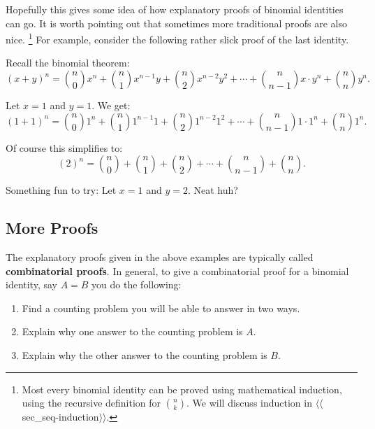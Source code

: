 \documentclass[10pt,]{book}
\newcommand{\terminology}[1]{\textbf{#1}}
\theoremstyle{plain}
\theoremstyle{definition}
\theoremstyle{definition}
\theoremstyle{definition}
\numberwithin{equation}{section}
\begin{document}
      Hopefully this gives some idea of how explanatory proofs of binomial identities can go. It is worth pointing out that sometimes more traditional proofs are also nice.
      \footnote{Most every binomial identity can be proved using mathematical induction, using the recursive definition for \({n \choose k}\). We will discuss induction in
        {$\langle\langle$sec_seq-induction$\rangle\rangle$}.\label{fn-3}} For example, consider the following rather slick proof of the last identity.
\par

      Recall the binomial theorem:
      \begin{equation*}
        (x + y)^n = {n \choose 0}x^n + {n \choose 1}x^{n-1}y + {n \choose 2}x^{n-2}y^2 + \cdots + {n \choose n-1}x\cdot y^n + {n \choose n}y^n.
      \end{equation*}
\par

      Let \(x = 1\) and \(y = 1\). We get:
      \begin{equation*}
        (1 + 1)^n = {n \choose 0}1^n + {n \choose 1}1^{n-1}1 + {n \choose 2}1^{n-2}1^2 + \cdots + {n \choose n-1}1\cdot 1^n + {n \choose n}1^n.
      \end{equation*}
\par

      Of course this simplifies to:
      \begin{equation*}
        (2)^n = {n \choose 0} + {n \choose 1} + {n \choose 2} + \cdots + {n \choose n-1} + {n \choose n}.
      \end{equation*}
\par

      Something fun to try: Let \(x = 1\) and \(y = 2\). Neat huh?
\typeout{************************************************}
\typeout{************************************************}
\subsection[More Proofs]{More Proofs}\label{subsec_moreProofs}

      The explanatory proofs given in the above examples are typically called \terminology{combinatorial proofs}. In general, to give a combinatorial proof for a binomial identity, say \(A = B\) you do the following:
\leavevmode%
\begin{enumerate}
\item\hypertarget{li-523}{}
      Find a counting problem you will be able to answer in two ways.
\item\hypertarget{li-524}{}
      Explain why one answer to the counting problem is \(A\).
\item\hypertarget{li-525}{}
      Explain why the other answer to the counting problem is \(B\).
\end{enumerate}
\par
\end{document}
